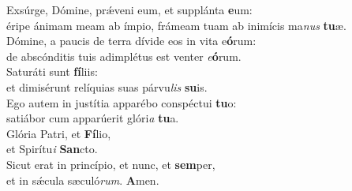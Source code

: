 \evenverse Exsúrge, Dómine, prǽveni eum, et supplánta \textbf{e}um:~\*\\
\evenverse éripe ánimam meam ab ímpio, frámeam tuam ab inimícis ma\textit{nus} \textbf{tu}æ.\\
\oddverse Dómine, a paucis de terra dívide eos in vita e\textbf{ó}rum:~\*\\
\oddverse de abscónditis tuis adimplétus est venter \textit{e}\textbf{ó}rum.\\
\evenverse Saturáti sunt \textbf{fí}liis:~\*\\
\evenverse et dimisérunt relíquias suas párvu\textit{lis} \textbf{su}is.\\
\oddverse Ego autem in justítia apparébo conspéctui \textbf{tu}o:~\*\\
\oddverse satiábor cum apparúerit glóri\textit{a} \textbf{tu}a.\\
\evenverse Glória Patri, et \textbf{Fí}lio,~\*\\
\evenverse et Spirítu\textit{i} \textbf{San}cto.\\
\oddverse Sicut erat in princípio, et nunc, et \textbf{sem}per,~\*\\
\oddverse et in sǽcula sæculó\textit{rum}. \textbf{A}men.\\
